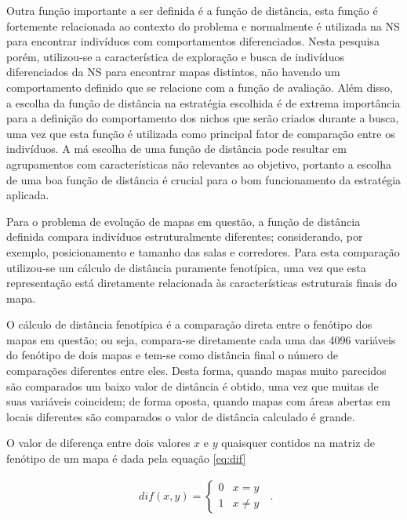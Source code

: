 Outra função importante a ser definida é a função de distância, esta função é fortemente relacionada ao contexto do problema e normalmente é utilizada na NS para encontrar indivíduos com comportamentos diferenciados. Nesta pesquisa porém, utilizou-se a característica de exploração e busca de indivíduos diferenciados da NS para encontrar mapas distintos, não havendo um comportamento definido que se relacione com a função de avaliação. Além disso, a escolha da função de distância na estratégia escolhida é de extrema importância para a definição do comportamento dos nichos que serão criados durante a busca, uma vez que esta função é utilizada como principal fator de comparação entre os indivíduos. A má escolha de uma função de distância pode resultar em agrupamentos com características não relevantes ao objetivo, portanto a escolha de uma boa função de distância é crucial para o bom funcionamento da estratégia aplicada.

Para o problema de evolução de mapas em questão, a função de distância definida compara indivíduos estruturalmente diferentes; considerando, por exemplo, posicionamento e tamanho das salas e corredores. Para esta comparação utilizou-se um cálculo de distância puramente fenotípica, uma vez que esta representação está diretamente relacionada às características estruturais finais do mapa.

O cálculo de distância fenotípica é a comparação direta entre o fenótipo dos mapas em questão; ou seja, compara-se diretamente cada uma das 4096 variáveis do fenótipo de dois mapas e tem-se como distância final o número de comparações diferentes entre eles. Desta forma, quando mapas muito parecidos são comparados um baixo valor de distância é obtido, uma vez que muitas de suas variáveis coincidem; de forma oposta, quando mapas com áreas abertas em locais diferentes são comparados o valor de distância calculado é grande.

O valor de diferença entre dois valores $x$ e $y$ quaisquer contidos na matriz de fenótipo de um mapa é dada pela equação \ref{eq:dif}

\begin{equation}
    \begin{aligned}
        dif(x,y) = \begin{cases}0 & x = y\\1 & x \neq y\end{cases}
    \end{aligned}~.
    \label{eq:dif}
\end{equation}


